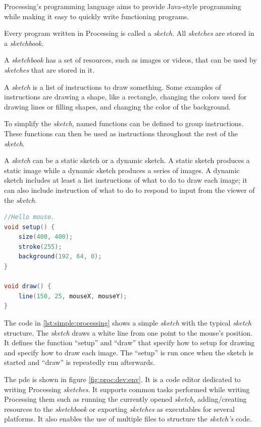 \documentclass{./llncs2e/llncs}
\begin{document}
Processing's programming language aims to provide Java-style programming while making it easy to quickly write functioning programs. 

Every program written in Processing is called a \emph{sketch}. All \emph{sketches} are stored in a \emph{sketchbook}.

A \emph{sketchbook} has a set of resources, such as images or videos, that can be used by \emph{sketches} that are stored in it.

A \emph{sketch} is a list of instructions to draw something. Some examples of instructions are drawing a shape, like a rectangle, changing the colors used for drawing lines or filling shapes, and changing the color of the background.

To simplify the \emph{sketch}, named functions can be defined to group instructions. These functions can then be used as instructions throughout the rest of the \emph{sketch}.

A \emph{sketch} can be a static sketch or a dynamic sketch. A static sketch produces a static image while a dynamic sketch produces a series of images. A dynamic sketch includes at least a list instructions of what to do to draw each image; it can also include instruction of what to do to respond to input from the viewer of the \emph{sketch}.

\begin{lstlisting}[caption={A simple Processing sketch},label={lst:simple:processing},language=Java]
//Hello mouse.
void setup() {
    size(400, 400);
    stroke(255);
    background(192, 64, 0);
}
 
void draw() {
    line(150, 25, mouseX, mouseY);
}
\end{lstlisting}

The code in \ref{lst:simple:processing} shows a simple \emph{sketch} with the typical \emph{sketch} structure. The \emph{sketch} draws a white line from one point to the mouse's position. It defines the function ``setup'' and  ``draw'' that specify how to setup for drawing and specify how to draw each image. The ``setup'' is run once when the sketch is started and ``draw'' is repeatedly run afterwards.

The \ac{pde} is shown in figure \ref{fig:proc:dev:env}. It is a code editor dedicated to writing Processing \emph{sketches}. It supports common tasks performed while writing Processing them such as running the currently opened \emph{sketch}, adding/creating resources to the \emph{sketchbook} or exporting \emph{sketches} as executables for several platforms. It also enables the use of multiple files to structure the \emph{sketch's} code.
\end{document}
